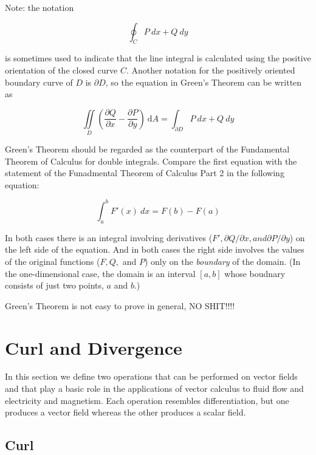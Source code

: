 \documentclass{article}
\begin{document}
Note: the notation 

\begin{equation*}
    \oint_C P \ dx + Q \ dy 
\end{equation*}

is sometimes used to indicate that the line integral is calculated using the positive orientation of the closed curve $C$. Another notation for the positively oriented boundary curve of $D$ is $\partial D$, so the equation in Green's Theorem can be written as 

\begin{equation*}
    \iint\limits_{D}(\frac{\partial Q}{\partial x} - \frac{\partial P}{\partial y}) \ \mathrm{d}A = \int_{\partial D} P \ dx + Q \ dy
\end{equation*}

Green's Theorem should be regarded as the counterpart of the Fundamental Theorem of Calculus for double integrals. Compare the first equation with the statement of the Funadmental Theorem of Calculus Part 2 in the following equation:

\begin{equation*}
    \int_{a}^{b}F'(x) \ dx = F(b) - F(a)
\end{equation*}

In both cases there is an integral involving derivatives ($F', \partial Q / \partial x, and \partial P / \partial y$) on the left side of the equation. And in both cases the right side involves the values of the original functions ($F, Q,$ and $P$) only on the \textit{boundary} of the domain. (In the one-dimensional case, the domain is an interval $[a,b]$ whose boudnary consists of just two points, $a$ and $b.$)

Green's Theorem is not easy to prove in general, NO SHIT!!!!


\newpage
\section{Curl and Divergence}

In this section we define two operations that can be performed on vector fields and that play a basic role in the applications of vector calculus to fluid flow and electricity and magnetism. Each operation resembles differentiation, but one produces a vector field whereas the other produces a scalar field.

\subsection{Curl}
\end{document}
